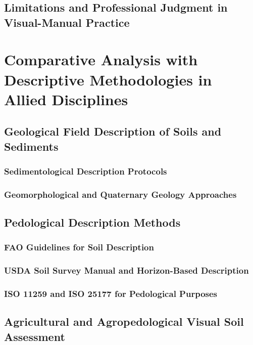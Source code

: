 \subsection{Limitations and Professional Judgment in Visual-Manual Practice}

\section{Comparative Analysis with Descriptive Methodologies in Allied Disciplines}

\subsection{Geological Field Description of Soils and Sediments}

\subsubsection{Sedimentological Description Protocols}

\subsubsection{Geomorphological and Quaternary Geology Approaches}

\subsection{Pedological Description Methods}

\subsubsection{FAO Guidelines for Soil Description}

\subsubsection{USDA Soil Survey Manual and Horizon-Based Description}

\subsubsection{ISO 11259 and ISO 25177 for Pedological Purposes}

\subsection{Agricultural and Agropedological Visual Soil Assessment}

